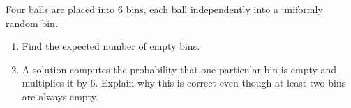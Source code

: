Four balls are placed into $6$ bins, each ball independently into a uniformly random bin.
\begin{enumerate}
\item[(a)] Find the expected number of empty bins.
\item[(b)] A solution computes the probability that one particular bin is empty and multiplies it by $6$. Explain why this is correct even though at least two bins are always empty.
\end{enumerate}

